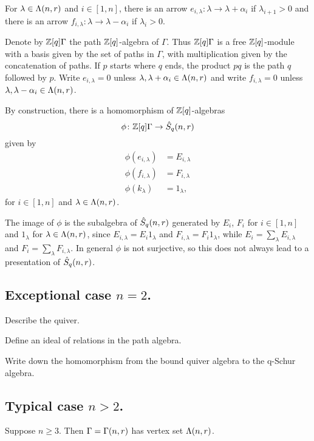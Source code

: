 \documentclass[a4paper, 11pt]{report}
\begin{document}
For $\lambda\in\Lambda(n,r)$ and $i\in [1,n]$, there is an arrow $e_{i,\lambda}:\lambda\to\lambda +\alpha_i$ if $\lambda_{i+1}>0$ and there is an arrow $f_{i,\lambda}:\lambda\to\lambda -\alpha_i$ if $\lambda_i>0$.

Denote by $\mathbb{Z}[q]\Gamma$ the path $\mathbb{Z}[q]$-algebra of $\Gamma$. Thus $\mathbb{Z}[q]\Gamma$ is a free $\mathbb{Z}[q]$-module with a basis given by the set of paths in $\Gamma$, with multiplication given by the concatenation of paths. If $p$ starts where $q$ ends, the product $pq$ is the path $q$ followed by $p$. Write $e_{i,\lambda}=0$ unless $\lambda,\lambda+\alpha_i\in\Lambda(n,r)$ and write $f_{i,\lambda}=0$ unless $\lambda,\lambda -\alpha_i\in\Lambda(n,r)$.

By construction, there is a homomorphism of $\mathbb{Z}[q]$-algebras
\begin{equation*}
\phi\colon \mathbb{Z}[q]\Gamma\to\hat{S}_q(n,r)
\end{equation*}
given by
\begin{align*}
\phi(e_{i,\lambda}) &= E_{i,\lambda}\\
\phi(f_{i,\lambda}) &= F_{i,\lambda}\\
\phi(k_\lambda) &= 1_{\lambda},
\end{align*}
for $i\in [1,n]$ and $\lambda\in\Lambda(n,r)$.

The image of $\phi$ is the subalgebra of $\hat{S}_q(n,r)$ generated by $E_i$, $F_i$ for $i\in [1,n]$ and $1_\lambda$ for $\lambda\in\Lambda(n,r)$, since $E_{i,\lambda}=E_i1_\lambda$ and $F_{i,\lambda}=F_i1_\lambda$, while $E_i = \sum_\lambda E_{i,\lambda}$ and $F_i = \sum_\lambda F_{i,\lambda}$. In general $\phi$ is not surjective, so this does not always lead to a presentation of $\hat{S}_q(n,r)$.

\subsection{Exceptional case $n=2$.}

Describe the quiver.

Define an ideal of relations in the path algebra.

Write down the homomorphism from the bound quiver algebra to the q-Schur algebra.

\subsection{Typical case $n>2$.}

Suppose $n\geq 3$. Then $\Gamma=\Gamma(n,r)$ has vertex set $\Lambda(n,r)$.\seeyoulater
\end{document}
